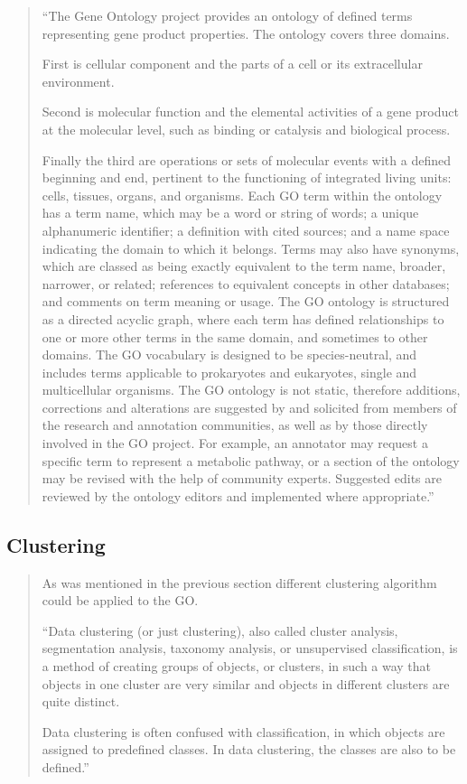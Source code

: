 \begin{quotation}
``The Gene Ontology project provides an ontology of defined terms representing gene product properties.
The ontology covers three domains.


First is cellular component and the parts of a cell or its extracellular environment.


Second is molecular function and the elemental activities of a gene product at the molecular level, such as binding or catalysis and biological process.


Finally the third are operations or sets of molecular events with a defined beginning and end, pertinent to the functioning of integrated living units: cells, tissues, organs, and organisms. Each GO term within the ontology has a term name, which may be a word or string of words;
a unique alphanumeric identifier; a definition with cited sources; and a name space indicating the domain to which it belongs.
Terms may also have synonyms, which are classed as being exactly equivalent to the term name, broader, narrower, or related; references to equivalent concepts in other databases;
and comments on term meaning or usage. The GO ontology is structured as a directed acyclic graph, where each term has defined relationships to one or more other terms in the same domain, and sometimes to other domains. The GO vocabulary is designed to be species-neutral,
and includes terms applicable to prokaryotes and eukaryotes, single and multicellular organisms.
The GO ontology is not static, therefore additions, corrections and alterations are suggested by and solicited from members of the research and annotation communities, as well as by those directly involved in the GO project.
For example, an annotator may request a specific term to represent a metabolic pathway, or a section of the ontology may be revised with the help of community experts.
Suggested edits are reviewed by the ontology editors and implemented where appropriate.''\cite{Gene_Ontology}
\end{quotation}

\subsection{Clustering}
\label{sec:clustering}

\begin{quotation}

As was mentioned in the previous section different clustering algorithm could be applied to the GO.

``Data clustering (or just clustering), also called cluster analysis, segmentation analysis, taxonomy analysis, or unsupervised classification, is a method of creating groups of objects, or clusters, in such a way that objects in one cluster are very similar and objects in different clusters are quite distinct.


Data clustering is often confused with classification, in which objects are assigned to predefined classes. In data clustering, the classes are also to be defined.''~\cite{data_clustering_book}
\end{quotation}

